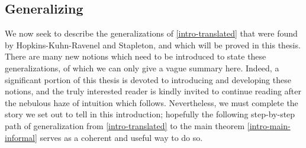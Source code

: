 \subsection{Generalizing}
\label{intro-gen}

We now seek to describe the generalizations of \cref{intro-translated}
that were found by Hopkins-Kuhn-Ravenel and Stapleton, and which will
be proved in this thesis. There are many new notions which need to be
introduced to state these generalizations, of which we can only give a
vague summary here. Indeed, a significant portion of this thesis is
devoted to introducing and developing these notions, and the truly
interested reader is kindly invited to continue reading after the
nebulous haze of intuition which follows. Nevertheless, we must
complete the story we set out to tell in this introduction; hopefully
the following step-by-step path of generalization from
\cref{intro-translated} to the main theorem \cref{intro-main-informal}
serves as a coherent and useful way to do so.

